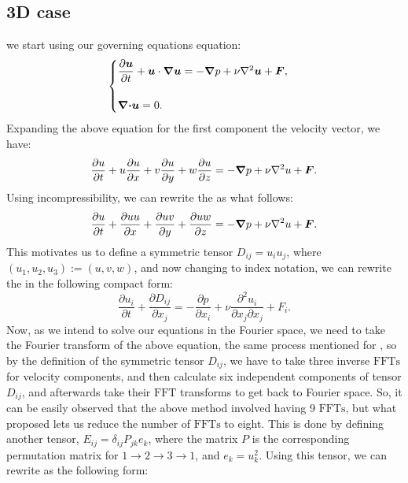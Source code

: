 \documentclass[12pt]{article}
\def\div{\grad\dot}
\def\lap{{\nabla}^2}
\begin{document}
\subsection{3D case}
we start using our governing equations  equation:
\begin{equation}
\begin{cases}
\dfrac{\partial \vu}{\partial t} + \vu\cdot\grad\vu = -\grad p + \nu\lap\vu + \vF,\\
\\
\div \vu=0.
\end{cases}
\end{equation}
Expanding the above equation for the first component the velocity vector, we have:
\begin{equation}\label{u-comp}
\dfrac{\partial u}{\partial t} + u\dfrac{\partial u}{\partial x} +v\dfrac{\partial u}{\partial y} + w\dfrac{\partial u}{\partial z}= -\grad p + \nu\lap u + \vF.
\end{equation}
Using incompressibility, we can rewrite the  as what follows:
\begin{equation}\label{u-comp+incomp}
\dfrac{\partial u}{\partial t} + \dfrac{\partial uu}{\partial x} +\dfrac{\partial uv}{\partial y} + \dfrac{\partial uw}{\partial z}= -\grad p + \nu\lap u + \vF.
\end{equation}
This motivates us to define a symmetric tensor $D_{ij}=u_iu_j$, where $(u_1,u_2,u_3):=(u,v,w)$, and now changing to index notation, we can rewrite the  in the following compact form:
\begin{equation}\label{GE-index}
\dfrac{\partial u_i}{\partial t} + \dfrac{\partial D_{ij}}{\partial x_j} = -\dfrac{\partial p}{\partial x_i} + \nu\dfrac{\partial^2 u_i}{\partial x_j\partial x_j} + F_i.
\end{equation}
Now, as we intend to solve our equations in the Fourier space, we need to take the Fourier transform of the above equation, the same process mentioned for , so by the definition of the symmetric tensor $D_{ij}$, we have to take three inverse $\text{FFTs}$ for velocity components, and then calculate six independent components of tensor $D_{ij}$, and afterwards take their $\text{FFT}$ transforms to get back to Fourier space. So, it can be easily observed that the above method involved having 9 $\text{FFTs}$, but what  proposed lets us reduce the number of $\text{FFTs}$ to eight. This is done by defining another tensor, $E_{ij}=\delta_{ij}P_{jk}e_k$, where the matrix $P$ is the corresponding permutation matrix for $1\rightarrow 2\rightarrow 3\rightarrow 1$, and $e_k=u_k^2$. Using this tensor, we can rewrite  as the following form:
\end{document}
